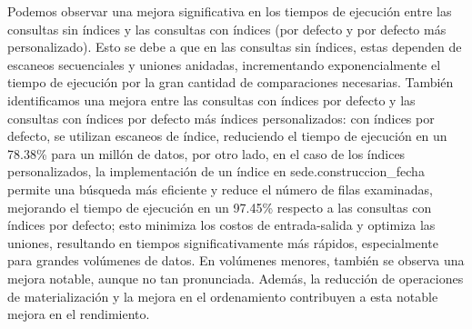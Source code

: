 Podemos observar una mejora significativa en los tiempos de ejecución entre las consultas sin índices y las consultas con índices (por defecto y por defecto más personalizado). Esto se debe a que en las consultas sin índices, estas dependen de escaneos secuenciales y uniones anidadas, incrementando exponencialmente el tiempo de ejecución por la gran cantidad de comparaciones necesarias. También identificamos una mejora entre las consultas con índices por defecto y las consultas con índices por defecto más índices personalizados: con índices por defecto, se utilizan escaneos de índice, reduciendo el tiempo de ejecución en un 78.38\% para un millón de datos, por otro lado, en el caso de los índices personalizados, la implementación de un índice en sede.construccion\_fecha permite una búsqueda más eficiente y reduce el número de filas examinadas, mejorando el tiempo de ejecución en un 97.45\% respecto a las consultas con índices por defecto; esto minimiza los costos de entrada-salida y optimiza las uniones, resultando en tiempos significativamente más rápidos, especialmente para grandes volúmenes de datos. En volúmenes menores, también se observa una mejora notable, aunque no tan pronunciada. Además, la reducción de operaciones de materialización y la mejora en el ordenamiento contribuyen a esta notable mejora en el rendimiento.
